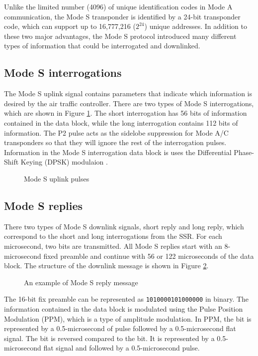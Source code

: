 Unlike the limited number (4096) of unique identification codes in Mode A communication, the Mode S transponder is identified by a 24-bit transponder code, which can support up to 16,777,216 ($2^{24}$) unique addresses. In addition to these two major advantages, the Mode S protocol introduced many different types of information that could be interrogated and downlinked.

\subsection{Mode S interrogations}
The Mode S uplink signal contains parameters that indicate which information is desired by the air traffic controller. There are two types of Mode S interrogations, which are shown in Figure \ref{fig:mode_s_uplink_pulses}. The short interrogation has 56 bits of information contained in the data block, while the long interrogation contains 112 bits of information. The P2 pulse acts as the sidelobe suppression for Mode A/C transponders so that they will ignore the rest of the interrogation pulses. Information in the Mode S interrogation data block is uses the Differential Phase-Shift Keying (DPSK) modulaion \cite{mazda2014}.

\begin{figure}[ht]
  \scalebox{0.9}{
    
  }
  \caption{Mode S uplink pulses}
  \label{fig:mode_s_uplink_pulses}
\end{figure}


\subsection{Mode S replies}
There two types of Mode S downlink signals, short reply and long reply, which correspond to the short and long interrogations from the SSR. For each microsecond, two bits are transmitted. All Mode S replies start with an 8-microsecond fixed preamble and continue with 56 or 122 microseconds of the data block. The structure of the downlink message is shown in Figure \ref{fig:mode_s_downlink_pulses}.

\begin{figure}[ht]
  \scalebox{0.9}{
    
  }
  \caption{An example of Mode S reply message}
  \label{fig:mode_s_downlink_pulses}
\end{figure}

The 16-bit fix preamble can be represented as \texttt{1010000101000000} in binary. The information contained in the data block is modulated using the Pulse Position Modulation (PPM), which is a type of amplitude modulation. In PPM, the \1 bit is represented by a 0.5-microsecond of pulse followed by a 0.5-microsecond flat signal. The \0 bit is reversed compared to the \1 bit. It is represented by a 0.5-microsecond flat signal and followed by a 0.5-microsecond pulse.


